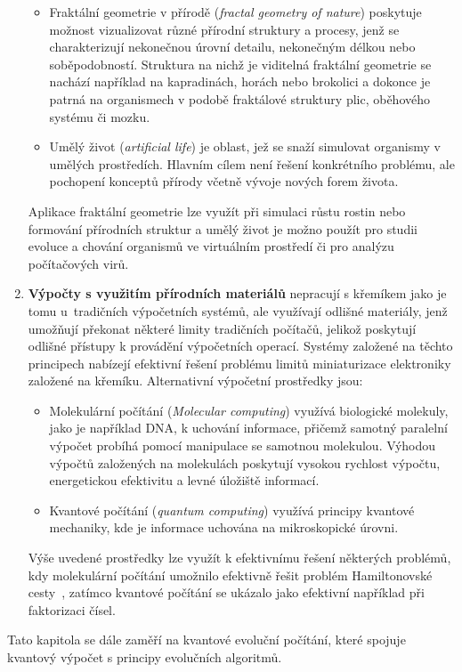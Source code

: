 \begin{enumerate}
\begin{itemize}
            \item Fraktální geometrie v přírodě (\emph{fractal geometry of nature}) poskytuje možnost vizualizovat různé přírodní struktury a procesy, jenž se charakterizují nekonečnou úrovní detailu, nekonečným délkou nebo soběpodobností. 
                Struktura na nichž je viditelná fraktální geometrie se nachází například na kapradinách, horách nebo brokolici a dokonce je patrná na organismech v podobě fraktálové struktury plic, oběhového systému či mozku. 
            \item Umělý život (\emph{artificial life}) je oblast, jež se snaží simulovat organismy v umělých prostředích. Hlavním cílem není řešení konkrétního problému, ale pochopení konceptů přírody včetně vývoje nových forem života. 
        \end{itemize}
        Aplikace fraktální geometrie lze využít při simulaci růstu rostin nebo formování přírodních struktur a umělý život je možno použít pro studii evoluce a chování organismů ve virtuálním prostředí či pro analýzu počítačových virů. 
    \item \textbf{Výpočty s využitím přírodních materiálů} 
        nepracují s křemíkem jako je tomu u~tradičních výpočetních systémů, ale využívají odlišné materiály, jenž umožňují překonat některé limity tradičních počítačů, jelikož poskytují odlišné přístupy k provádění výpočetních operací. 
        Systémy založené na těchto principech nabízejí efektivní řešení problému limitů miniaturizace elektroniky založené na křemíku. 
        Alternativní výpočetní prostředky jsou:
        \begin{itemize}
            \item Molekulární počítání (\emph{Molecular computing}) využívá biologické molekuly, jako je například DNA, k uchování informace, přičemž samotný paralelní výpočet probíhá pomocí manipulace se samotnou molekulou. 
                Výhodou výpočtů založených na molekulách poskytují vysokou rychlost výpočtu, energetickou efektivitu a levné úložiště informací.  
            \item Kvantové počítání (\emph{quantum computing}) využívá principy kvantové mechaniky, kde je informace uchována na mikroskopické úrovni. 
        \end{itemize}
        Výše uvedené prostředky lze využít k efektivnímu řešení některých problémů, kdy molekulární počítání umožnilo efektivně řešit problém Hamiltonovské cesty~\cite{molecular}, zatímco kvantové počítání se ukázalo jako efektivní například při faktorizaci čísel. 
\end{enumerate}
Tato kapitola se dále zaměří na kvantové evoluční počítání, které spojuje kvantový výpočet s principy evolučních algoritmů.

